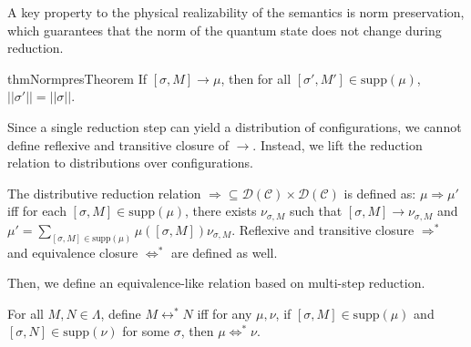 A key property to the physical realizability of the semantics is norm preservation, which guarantees that the norm of the quantum state does not change during reduction.
\begin{restatable}{thm}{NormpresTheorem} \label{thm:norm-pres}
  If $[\sigma,M] \longrightarrow \mu$, then for all $[\sigma',M']\in\mathrm{supp}(\mu)$, $||\sigma'|| = ||\sigma||$.
\end{restatable}

Since a single reduction step can yield a distribution of configurations, we cannot define reflexive and transitive closure of $\longrightarrow$.
Instead, we lift the reduction relation to distributions over configurations.
\begin{dfn}
  The distributive reduction relation $\Longrightarrow \subseteq \mathcal{D}(\mathcal{C})\times \mathcal{D}(\mathcal{C})$ is defined as: $\mu \Longrightarrow \mu'$ iff for each $[\sigma,M]\in\mathrm{supp}(\mu)$, there exists $\nu_{\sigma,M}$ such that $[\sigma,M] \longrightarrow \nu_{\sigma,M}$ and $\mu' = \sum_{[\sigma,M]\in\mathrm{supp}(\mu)} \mu([\sigma,M])\nu_{\sigma,M}$.
  Reflexive and transitive closure $\Longrightarrow^*$ and equivalence closure $\Longleftrightarrow^*$ are defined as well.
\end{dfn}

Then, we define an equivalence-like relation based on multi-step reduction.
\begin{dfn}
  For all $M, N \in \Lambda$, define $M \longleftrightarrow^* N$ iff
  for any $\mu, \nu$, if $[\sigma, M] \in \mathrm{supp}(\mu)$ and $[\sigma, N] \in \mathrm{supp}(\nu)$ for some $\sigma$, then $\mu \Longleftrightarrow^* \nu$.
\end{dfn}


